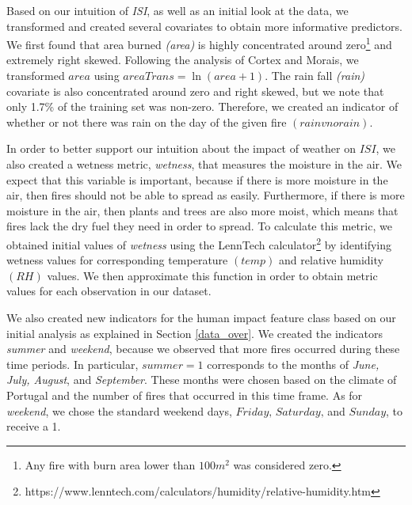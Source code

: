 \documentclass{article}
\begin{document}
Based on our intuition of \textit{ISI}, as well as an initial look at the data, we transformed and created several covariates to obtain more informative predictors. We first found that area burned \textit{(area)} is highly concentrated around zero\footnote{Any fire with burn area lower than $100m^2$ was considered zero.} and extremely right skewed. Following the analysis of Cortex and Morais, we transformed $\textit{area}$ using $\textit{areaTrans} = \ln(\textit{area} + 1)$. The rain fall \textit{(rain)} covariate is also concentrated around zero and right skewed, but we note that only 1.7\% of the training set was non-zero. Therefore, we created an indicator of whether or not there was rain on the day of the given fire $(\textit{rainvnorain})$. 

In order to better support our intuition about the impact of weather on $\textit{ISI}$, we also created a wetness metric, \textit{wetness}, that measures the moisture in the air. We expect that this variable is important, because if there is more moisture in the air, then fires should not be able to spread as easily. Furthermore, if there is more moisture in the air, then plants and trees are also more moist, which means that fires lack the dry fuel they need in order to spread. To calculate this metric, we obtained initial values of \textit{wetness} using the LennTech calculator\footnote{https://www.lenntech.com/calculators/humidity/relative-humidity.htm} by identifying wetness values for corresponding temperature $(\textit{temp})$ and relative humidity $(\textit{RH})$ values. We then approximate this function in order to obtain metric values for each observation in our dataset. 

We also created new indicators for the human impact feature class based on our initial analysis as explained in Section \ref{data_over}. We created the indicators \textit{summer} and \textit{weekend}, because we observed that more fires occurred during these time periods. In particular, $\textit{summer} = 1$ corresponds to the months of \textit{June, July, August}, and \textit{ September}. These months were chosen based on the climate of Portugal and the number of fires that occurred in this time frame. As for \textit{weekend}, we chose the standard weekend days, $\textit{Friday, Saturday,}$ and $\textit{Sunday}$, to receive a 1.
\end{document}

